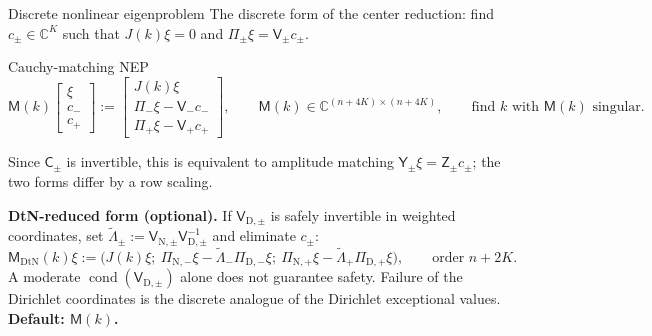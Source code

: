 \documentclass[aspectratio=169]{beamer}
\newcommand{\CC}{\mathbb{C}}
\begin{document}
\begin{frame}{Discrete nonlinear eigenproblem}
  \small
  The discrete form of the center reduction: find $c_\pm\in\CC^K$ such that
  $J(k)\xi=0$ and $\Pi_\pm\xi=\mathsf V_\pm c_\pm$.
  \begin{block}{Cauchy-matching NEP}
    \[
      \mathsf M(k)\begin{bmatrix}\xi\\ c_-\\ c_+\end{bmatrix}
      :=\begin{bmatrix}J(k)\xi\\ \Pi_-\xi-\mathsf V_-c_-\\ \Pi_+\xi-\mathsf V_+c_+\end{bmatrix},
      \qquad\mathsf M(k)\in\CC^{(n+4K)\times(n+4K)},
      \qquad\text{find $k$ with $\mathsf M(k)$ singular.}
    \]
  \end{block}
  Since $\mathsf C_\pm$ is invertible, this is equivalent to amplitude matching
  $\mathsf Y_\pm\xi=\mathsf Z_\pm c_\pm$; the two forms differ by a row scaling.

  \medskip
  \textbf{DtN-reduced form (optional).} If $\mathsf V_{\mathrm D,\pm}$ is safely
  invertible in weighted coordinates, set
  $\widetilde\Lambda_\pm:=\mathsf V_{\mathrm N,\pm}\mathsf V_{\mathrm D,\pm}^{-1}$ and eliminate $c_\pm$:
  \[
    \mathsf M_{\mathrm{DtN}}(k)\xi:=
    \bigl(J(k)\xi;\ \Pi_{\mathrm N,-}\xi-\widetilde\Lambda_-\Pi_{\mathrm D,-}\xi;\
      \Pi_{\mathrm N,+}\xi-\widetilde\Lambda_+\Pi_{\mathrm D,+}\xi\bigr),\qquad\text{order }n+2K.
  \]
  A moderate $\operatorname{cond}(\mathsf V_{\mathrm D,\pm})$ alone does not guarantee
  safety. Failure of the Dirichlet coordinates is the discrete analogue of the
  Dirichlet exceptional values. \textbf{Default: $\mathsf M(k)$.}
\end{frame}
\end{document}
